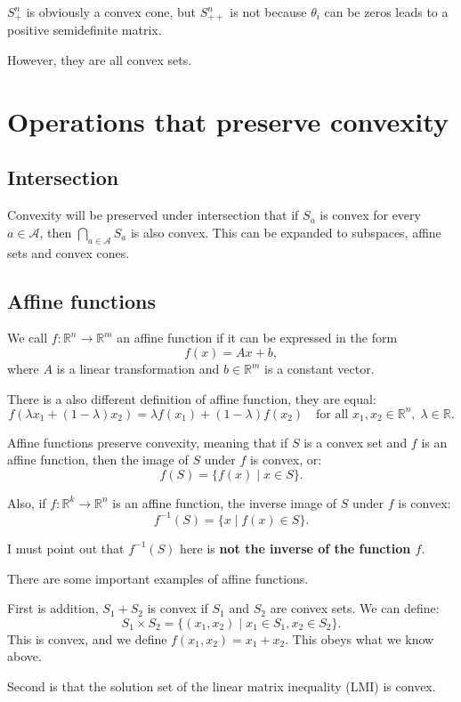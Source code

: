 \documentclass[lang=en,color=blue,mode=fancy,titlestyle=hang]{elegantbook}
\begin{document}
$S^n_+$ is obviously a convex cone, but $S^n_{++}$ is not because $\theta_i$ can be zeros
leads to a positive semidefinite matrix.

However, they are all convex sets.

\section{Operations that preserve convexity}
\subsection{Intersection}
Convexity will be preserved under intersection that if $S_a$ is convex for every
$a \in \mathcal{A}$, then $\bigcap_{a \in \mathcal{A}} S_a$ is also convex. This can be
expanded to subspaces, affine sets and convex cones.

\subsection{Affine functions}
We call $f: \mathbb{R}^n \rightarrow \mathbb{R}^m$ an affine function if it can be expressed
in the form
\[
f(x) = Ax + b,
\]
where $A$ is a linear transformation and $b \in \mathbb{R}^m$ is a constant vector. 

There is a also different definition of affine function, they are equal:
\[
f(\lambda x_1 + (1 - \lambda) x_2) = \lambda f(x_1) + (1 - \lambda) f(x_2) \quad \text{for all } x_1, x_2 \in \mathbb{R}^n, \; \lambda \in \mathbb{R}.
\]

Affine functions preserve convexity, meaning that if $S$ is a convex set and $f$ is an affine
function, then the image of $S$ under $f$ is convex, or:
\[
f(S) = \{f(x) \;|\; x \in S\}.
\]

Also, if $f: \mathbb{R}^k \rightarrow \mathbb{R}^n$ is an affine function, the inverse image
of $S$ under $f$ is convex:
\[
f^{-1}(S) = \{x \;|\; f(x) \in S\}.
\]

I must point out that $f^{-1}(S)$ here is \textbf{not the inverse of the function $f$}.

There are some important examples of affine functions.

First is addition, $S_1 + S_2$ is convex if $S_1$ and $S_2$ are convex sets. We can define:
\[
S_1 \times S_2 = \{(x_1, x_2) \;|\; x_1 \in S_1, x_2 \in S_2\}.
\]
This is convex, and we define $f(x_1, x_2) = x_1 + x_2$. This obeys what we know above.

Second is that the solution set of the linear matrix inequality (LMI) is convex.
\end{document}
